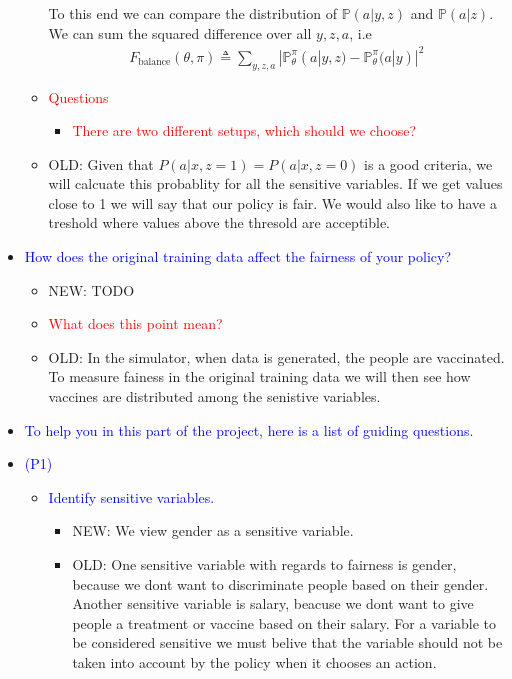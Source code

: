 \begin{itemize}
\begin{itemize}
        To this end we can compare the distribution of $\mathbb{P}(a|y,z)$ and $\mathbb{P}(a|z)$. 
        We can sum the squared difference over all $y, z, a$, i.e
        \begin{align*}
            F_{\text{balance}}(\theta, \pi) \triangleq \sum_{y,z,a} |\mathbb{P}_{\theta}^{\pi} (a|y,z) - \mathbb{P}_{\theta}^{\pi}(a|y)|^2
        \end{align*}  
        \item \textcolor{red}{Questions}
        \begin{itemize}
            \item \textcolor{red}{There are two different setups, which should we choose?}
        \end{itemize}
        \item OLD: Given that $P(a|x,z=1) = P(a|x,z=0)$ is a good criteria, we will calcuate this probablity for all the sensitive variables. If we get values close to 1 we will say that our policy is fair. We would also like to have a treshold where values above the thresold are acceptible.
    \end{itemize}
    \item \textcolor{blue}{How does the original training data affect the fairness of your policy?}
    \begin{itemize}
        \item NEW: TODO
        \item \textcolor{red}{What does this point mean?}
        \item OLD: In the simulator, when data is generated, the people are vaccinated. To measure fainess in the original training data we will then see how vaccines are distributed among the senistive variables. 
    \end{itemize}
    \item \textcolor{blue}{To help you in this part of the project, here is a list of guiding questions.}
    \item \textcolor{blue}{(P1)}
        \begin{itemize}
            \item \textcolor{blue}{Identify sensitive variables.}
            \begin{itemize}
                \item NEW: We view gender as a sensitive variable. 
                \item OLD: One sensitive variable with regards to fairness is gender, because we dont want to discriminate people based on their gender. Another sensitive variable is salary, beacuse we dont want to give people a treatment or vaccine based on their salary. For a variable to be considered sensitive we must belive that the variable should not be taken into account by the policy when it chooses an action. 

\end{itemize}
\end{itemize}
\end{itemize}

